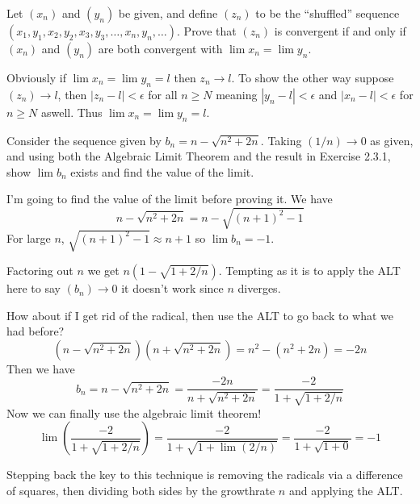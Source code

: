 \begin{exercise}
  Let $\left(x_{n}\right)$ and $\left(y_{n}\right)$ be given, and define $\left(z_{n}\right)$ to be the ``shuffled'' sequence $\left(x_{1}, y_{1}, x_{2}, y_{2}, x_{3}, y_{3}, \ldots, x_{n}, y_{n}, \ldots\right)$. Prove that $\left(z_{n}\right)$ is convergent if and only if $\left(x_{n}\right)$ and $\left(y_{n}\right)$ are both convergent with $\lim x_{n}=\lim y_{n}$.
\end{exercise}


\begin{solution}
  Obviously if $\lim x_n = \lim y_n = l$ then $z_n \to l$. To show the other way suppose $(z_n) \to l$, then $|z_n - l| < \epsilon$ for all $n \ge N$ meaning $|y_n - l| < \epsilon$ and $|x_n - l| < \epsilon$ for $n \ge N$ aswell. Thus $\lim x_n = \lim y_n = l$.
\end{solution}

\begin{exercise}
  Consider the sequence given by $b_{n}=n-\sqrt{n^{2}+2 n}$. Taking $(1 / n) \rightarrow 0$ as given, and using both the Algebraic Limit Theorem and the result in Exercise 2.3.1, show $\lim b_{n}$ exists and find the value of the limit.
\end{exercise}

\begin{solution}
  I'm going to find the value of the limit before proving it. We have
  $$
  n - \sqrt{n^2 + 2n} = n - \sqrt{(n + 1)^2 - 1}
  $$
  For large $n$, $\sqrt{(n + 1)^2 - 1} \approx n + 1$ so $\lim b_n = -1$.

  Factoring out $n$ we get $n\left(1 - \sqrt{1 + 2/n}\right)$. Tempting as it is to apply the ALT here to say $(b_n) \to 0$ it doesn't work since $n$ diverges.

  How about if I get rid of the radical, then use the ALT to go back to what we had before?
  $$
  (n - \sqrt{n^2 + 2n})(n + \sqrt{n^2 + 2n}) = n^2 - (n^2 + 2n) = -2n
  $$
  Then we have
  $$
  b_n = n - \sqrt{n^2 + 2n} = \frac{-2n}{n + \sqrt{n^2 + 2n}} = \frac{-2}{1 + \sqrt{1 + 2/n}}
  $$
  Now we can finally use the algebraic limit theorem!
  $$
  \lim\left(\frac{-2}{1 + \sqrt{1 + 2/n}}\right) = \frac{-2}{1 + \sqrt{1 + \lim\left(2/n\right)}} = \frac{-2}{1 + \sqrt{1 + 0}} = -1
  $$

  Stepping back the key to this technique is removing the radicals via a difference of squares, then dividing both sides by the growthrate $n$ and applying the ALT.
\end{solution}

